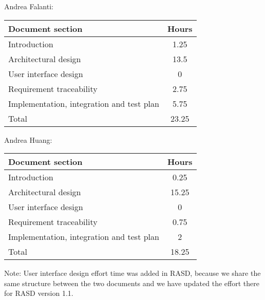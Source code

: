 Andrea Falanti:

\begin{tabular}{|l|c|}
    \hline
    Document section & Hours \\
    \hline
     Introduction & 1.25\\
     Architectural design & 13.5\\
     User interface design & 0\\
     Requirement traceability & 2.75\\
     Implementation, integration and test plan & 5.75\\
     \hline
     Total & 23.25\\
     \hline
\end{tabular}
\vskip 0.3in

Andrea Huang:

\begin{tabular}{|l|c|}
    \hline
    Document section & Hours \\
    \hline
     Introduction & 0.25\\
     Architectural design & 15.25\\
     User interface design & 0\\
     Requirement traceability & 0.75\\
     Implementation, integration and test plan & 2\\
     \hline
     Total & 18.25\\
     \hline
\end{tabular}

\bigskip
\bigskip
Note: User interface design effort time was added in RASD, because we share the same structure between the two documents and we have updated the effort there for RASD version 1.1. 